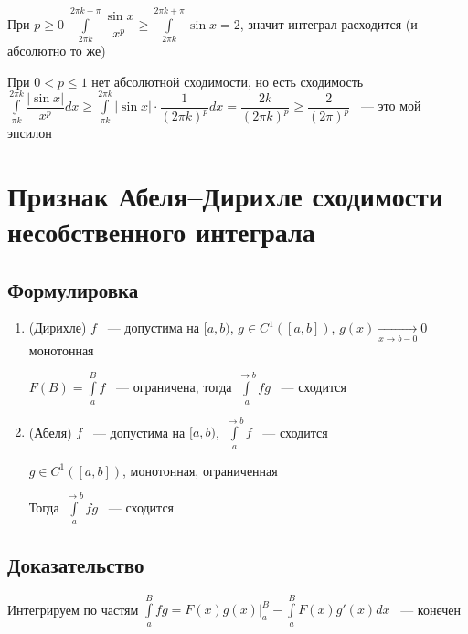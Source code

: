 \documentclass{article}
\begin{document}
        При $p \geq 0$ $\int\limits^{2 \pi k + \pi}_{2 \pi k} \dfrac{\sin{x}}{x^p} \geq \int\limits^{2 \pi k + \pi}_{2 \pi k} \sin{x} = 2$, значит интеграл расходится (и абсолютно то же)
        
        При $0 < p \leq 1$ нет абсолютной сходимости, но есть сходимость $\int\limits^{2 \pi k}_{\pi k} \dfrac{| \sin{x}|}{x^p} dx \geq \int\limits^{2 \pi k}_{\pi k} |\sin {x}| \cdot \dfrac{1}{(2 \pi k)^p} dx = \dfrac{2k}{(2 \pi k)^p} \geq \dfrac{2}{(2 \pi)^p}$ ~--- это мой эпсилон
        
        
    \newpage
    
    \section{Признак Абеля--Дирихле сходимости несобственного интеграла}
    
        \subsection{Формулировка}
        
            \begin{enumerate}
            
                \item (Дирихле) $f$ ~--- допустима на $[a, b)$, $g \in C^1 \left( [a, b] \right)$, $g(x) \xrightarrow[x \rightarrow b - 0]{} 0$ монотонная
                
                    $F(B) = \int\limits^B_a f$ ~--- ограничена, тогда $\int\limits^{\rightarrow b}_a fg$ ~--- сходится
                    
                \item (Абеля) $f$ ~--- допустима на $[a, b)$, $\int\limits^{\rightarrow b}_a f$ ~--- сходится
                
                    $g \in C^1 \left([a, b] \right)$, монотонная, ограниченная
                    
                    Тогда $\int\limits^{\rightarrow b}_a fg$ ~--- сходится
                
            \end{enumerate}
            
        \subsection{Доказательство}
        
            Интегрируем по частям $\int\limits^B_a fg = F(x) g(x) \bigg|^B_a - \int\limits^B_a F(x) g'(x) dx$ ~--- конечен
            
\end{document}
